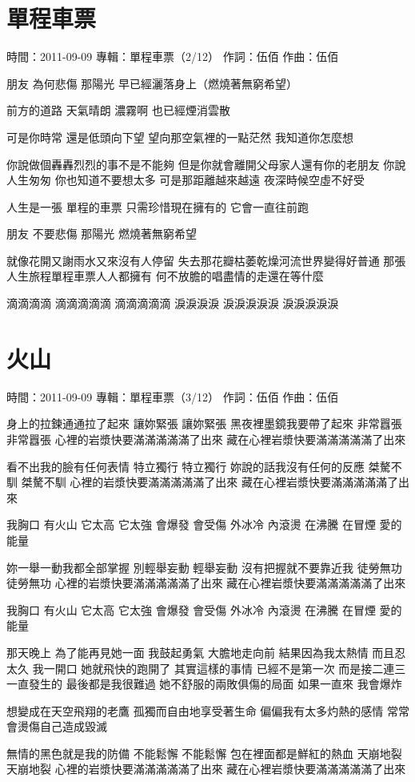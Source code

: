 \documentclass[UTF8,a4paper,oneside,twocolumn,12pt]{ctexbook}
\newcommand{\infopair}[2]{\textbullet #1：#2}
\newcommand{\zc}[1][伍佰]{\infopair{作詞}{#1}}
\newcommand{\zq}[1][伍佰]{\infopair{作曲}{#1}}
\newcommand{\zj}[1]{\infopair{專輯}{#1}}
\newcommand{\sj}[1]{\infopair{時間}{#1}}
\newenvironment{info}{\begin{flushleft}\kaishu
	}
	{\end{flushleft}\normalsize\yahei\par}
\newenvironment{lyric}{
	}
{}
\begin{document}
\section{單程車票}
\begin{info}
	\sj{2011-09-09}
	\zj{單程車票（2/12）}
	\zc
	\zq
\end{info}
\begin{lyric}
	朋友 為何悲傷
	那陽光 早已經灑落身上（燃燒著無窮希望）

	前方的道路 天氣晴朗
	濃霧啊 也已經煙消雲散

	可是你時常 還是低頭向下望
	望向那空氣裡的一點茫然 我知道你怎麼想

	你說做個轟轟烈烈的事不是不能夠
	但是你就會離開父母家人還有你的老朋友
	你說人生匆匆 你也知道不要想太多
	可是那距離越來越遠 夜深時候空虛不好受

	人生是一張 單程的車票
	只需珍惜現在擁有的 它會一直往前跑

	朋友 不要悲傷
	那陽光 燃燒著無窮希望

	就像花開又謝雨水又來沒有人停留
	失去那花瓣枯萎乾燥河流世界變得好普通
	那張人生旅程單程車票人人都擁有
	何不放膽的唱盡情的走還在等什麼

	滴滴滴滴 滴滴滴滴滴 滴滴滴滴滴
	淚淚淚淚 淚淚淚淚淚 淚淚淚淚淚
\end{lyric}

\section{火山}
\begin{info}
	\sj{2011-09-09}
	\zj{單程車票（3/12）}
	\zc
	\zq
\end{info}
\begin{lyric}
	身上的拉鍊通通拉了起來
	讓妳緊張 讓妳緊張
	黑夜裡墨鏡我要帶了起來
	非常囂張 非常囂張
	心裡的岩漿快要滿滿滿滿滿了出來
	藏在心裡岩漿快要滿滿滿滿滿了出來

	看不出我的臉有任何表情
	特立獨行 特立獨行
	妳說的話我沒有任何的反應
	桀驁不馴 桀驁不馴
	心裡的岩漿快要滿滿滿滿滿了出來
	藏在心裡岩漿快要滿滿滿滿滿了出來

	我胸口 有火山 它太高 它太強
	會爆發 會受傷 外冰冷 內滾燙
	在沸騰 在冒煙 愛的能量

	妳一舉一動我都全部掌握
	別輕舉妄動 輕舉妄動
	沒有把握就不要靠近我
	徒勞無功 徒勞無功
	心裡的岩漿快要滿滿滿滿滿了出來
	藏在心裡岩漿快要滿滿滿滿滿了出來

	我胸口 有火山 它太高 它太強
	會爆發 會受傷 外冰冷 內滾燙
	在沸騰 在冒煙 愛的能量

	那天晚上 為了能再見她一面
	我鼓起勇氣 大膽地走向前
	結果因為我太熱情 而且忍太久
	我一開口 她就飛快的跑開了
	其實這樣的事情 已經不是第一次
	而是接二連三一直發生的
	最後都是我很難過
	她不舒服的兩敗俱傷的局面
	如果一直來 我會爆炸

	想變成在天空飛翔的老鷹
	孤獨而自由地享受著生命
	偏偏我有太多灼熱的感情
	常常會燙傷自己造成毀滅

	無情的黑色就是我的防備
	不能鬆懈 不能鬆懈
	包在裡面都是鮮紅的熱血
	天崩地裂 天崩地裂
	心裡的岩漿快要滿滿滿滿滿了出來
	藏在心裡岩漿快要滿滿滿滿滿了出來
\end{lyric}
\end{document}
